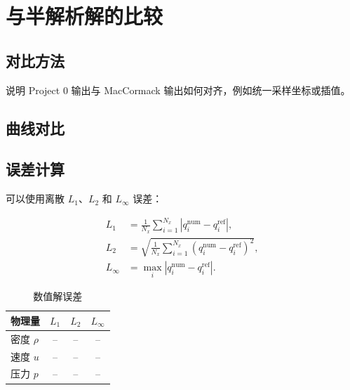 \section{与半解析解的比较}

\subsection{对比方法}

说明 Project 0 输出与 MacCormack 输出如何对齐，例如统一采样坐标或插值。

\subsection{曲线对比}


\subsection{误差计算}

可以使用离散 $L_1$、$L_2$ 和 $L_\infty$ 误差：

\begin{align}
L_1 &= \frac{1}{N_x}\sum_{i=1}^{N_x}
\left|q_i^{\mathrm{num}}-q_i^{\mathrm{ref}}\right|,\\
L_2 &= \sqrt{\frac{1}{N_x}\sum_{i=1}^{N_x}
\left(q_i^{\mathrm{num}}-q_i^{\mathrm{ref}}\right)^2},\\
L_\infty &= \max_i
\left|q_i^{\mathrm{num}}-q_i^{\mathrm{ref}}\right|.
\end{align}

\begin{table}[H]
    \centering
    \caption{数值解误差}
    \label{tab:error}
    \begin{tabular}{lccc}
        \toprule
        物理量 & $L_1$ & $L_2$ & $L_\infty$\\
        \midrule
        密度 $\rho$ & -- & -- & --\\
        速度 $u$ & -- & -- & --\\
        压力 $p$ & -- & -- & --\\
        \bottomrule
    \end{tabular}
\end{table}
